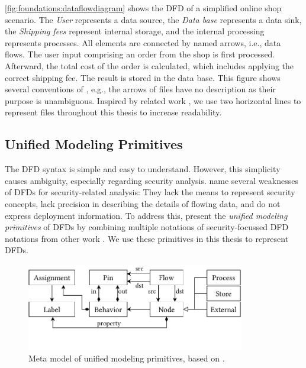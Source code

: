 \autoref{fig:foundations:dataflowdiagram} shows the \ac{DFD} of a simplified online shop scenario.
The \emph{User} represents a data source, the \emph{Data base} represents a data sink, the \emph{Shipping fees} represent internal storage, and the internal processing represents processes.
All elements are connected by named arrows, i.e., data flows.
The user input comprising an order from the shop is first processed.
Afterward, the total cost of the order is calculated, which includes applying the correct shipping fee.
The result is stored in the data base.
This figure shows several conventions of \textcite{demarco_structure_1979}, e.g., the arrows of files have no description as their purpose is unambiguous.
Inspired by related work \cite{seifermann_architectural_2022}, we use two horizontal lines to represent files throughout this thesis to increase readability.


\subsection{Unified Modeling Primitives}

The \ac{DFD} syntax is simple and easy to understand.
However, this simplicity causes ambiguity, especially regarding security analysis.
\textcite{sion_security_2020} name several weaknesses of \acp{DFD} for security-related analysis:
They lack the means to represent security concepts, lack precision in describing the details of flowing data, and do not express deployment information.
To address this, \textcite{seifermann_unified_2021} present the \emph{unified modeling primitives} of \acp{DFD} by combining multiple notations of security-focussed \ac{DFD} notations from other work \cite{seifermann_data-driven_2019,tuma_flaws_2019}.
We use these primitives in this thesis to represent \acp{DFD}.

\begin{figure}
    \centering
    \includegraphics[width=0.85\textwidth]{figures/chapter2/unifiedmodelingprimitives.pdf}
    \caption{Meta model of unified modeling primitives, based on \textcite{seifermann_unified_2021}.}
    \label{fig:foundations:unifiedmodelingprimitives}
\end{figure}

